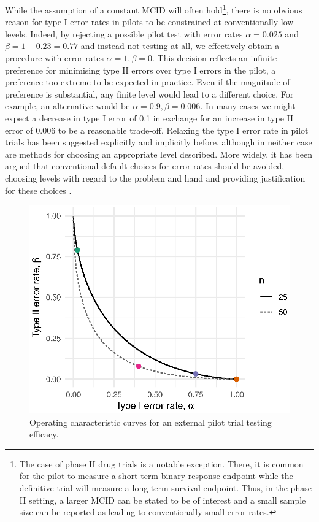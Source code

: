 \documentclass[sagev, Crown]{sagej}
\begin{document}
While the assumption of a constant MCID will often hold\footnote{The case of phase II drug trials is a notable exception. There, it is common for the pilot to measure a short term binary response endpoint while the definitive trial will measure a long term survival endpoint. Thus, in the phase II setting, a larger MCID can be stated to be of interest and a small sample size can be reported as leading to conventionally small error rates.}, there is no obvious reason for type I error rates in pilots to be constrained at conventionally low levels. Indeed, by rejecting a possible pilot test with error rates $\alpha = 0.025$ and $\beta = 1 - 0.23 = 0.77$ and instead not testing at all, we effectively obtain a procedure with error rates $\alpha = 1, \beta = 0$. This decision reflects an infinite preference for minimising type II errors over type I errors in the pilot, a preference too extreme to be expected in practice. Even if the magnitude of preference is substantial, any finite level would lead to a different choice. For example, an alternative would be $\alpha = 0.9, \beta = 0.006$. In many cases we might expect a decrease in type I error of 0.1 in exchange for an increase in type II error of 0.006 to be a reasonable trade-off. Relaxing the type I error rate in pilot trials has been suggested explicitly \cite{Lee2014} and implicitly \cite{Cocks2013} before, although in neither case are methods for choosing an appropriate level described. More widely, it has been argued that conventional default choices for error rates should be avoided, choosing levels with regard to the problem and hand and providing justification for these choices \cite{Lakens2018, Bacchetti2019}.

\begin{figure}
\centering
\includegraphics[scale=0.8]{./figures/ocs.eps}
\caption{Operating characteristic curves for an external pilot trial testing efficacy.}
\label{fig:ocs}
\end{figure} 
\end{document}

